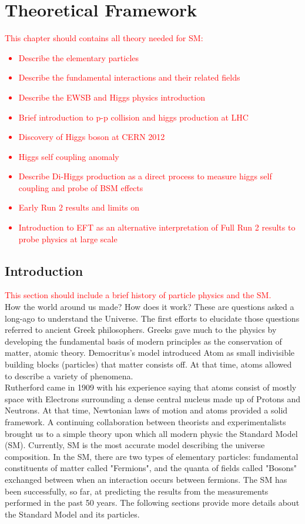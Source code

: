\newpage
\chapter{Theoretical Framework}
\label{chap1}
\textcolor{red}{ This chapter should contains all theory needed for SM:
\begin{itemize}
    \item Describe the elementary particles 
    \item Describe the fundamental interactions and their related fields
    \item Describe the EWSB and Higgs physics introduction
    \item Brief introduction to p-p collision and higgs production at LHC
    \item Discovery of Higgs boson at CERN 2012
    \item Higgs self coupling anomaly
    \item Describe Di-Higgs production as a direct process to measure higgs self coupling and probe of BSM effects
    \item Early Run 2 results and limits on \kl
    \item Introduction to EFT as an alternative interpretation of Full Run 2 results to probe physics at large scale 
\end{itemize}
}
\section{Introduction}
\label{chap1:intro}

\textcolor{red}{This section should include a brief history of particle physics and the SM. \\
}
How the world around us made? How does it work? These are questions asked a long-ago to understand the Universe. The first efforts to elucidate those questions referred to ancient Greek philosophers. Greeks gave much to the physics by developing the fundamental basis of modern principles as the conservation of matter, atomic theory. Democritus's model introduced Atom as small indivisible building blocks (particles) that matter consists off. At that time, atoms allowed to describe a variety of phenomena. \\
Rutherford came in 1909 with his experience saying that atoms consist of mostly space with Electrons surrounding a dense central nucleus made up of Protons and Neutrons. At that time, Newtonian laws of motion and atoms provided a solid framework. A continuing collaboration between theorists and experimentalists brought us to a simple theory upon which all modern physic the Standard Model (SM). Currently, SM is the most accurate model describing the universe composition. In the SM, there are two types of elementary particles: fundamental constituents of matter called "Fermions", and the quanta of fields called "Bosons" exchanged between when an interaction occurs between fermions. The SM has been successfully, so far, at predicting the results from the measurements performed in the past 50 years. The following sections provide more details about the Standard Model and its particles.
